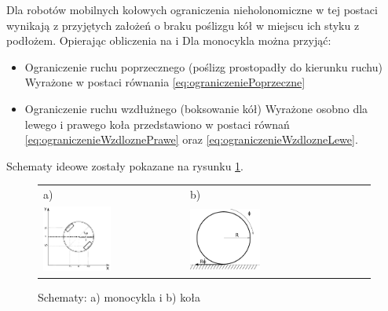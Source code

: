         Dla robotów mobilnych kołowych ograniczenia nieholonomiczne w tej postaci wynikają z przyjętych założeń o braku poślizgu kół w miejscu ich styku z podłożem. Opierając obliczenia na \cite{Mazur} i \cite{Cholewinski} Dla monocykla można przyjąć:
        \begin{itemize}
            \item Ograniczenie ruchu poprzecznego (poślizg prostopadły do kierunku ruchu) \newline
                Wyrażone w postaci równania \ref{eq:ograniczeniePoprzeczne}
            \item Ograniczenie ruchu wzdłużnego (boksowanie kół) \newline
                Wyrażone osobno dla lewego i prawego koła przedstawiono w postaci równań \ref{eq:ograniczenieWzdloznePrawe} oraz \ref{eq:ograniczenieWzdlozneLewe}.
        \end{itemize}
        Schematy ideowe zostały pokazane na rysunku \ref{fig:monocykSchemat}.
    	\begin{figure}[ht]
			\centering
			\begin{tabular}{@{}ll@{}}
				a) & b) \\
				\includegraphics[width=0.5\textwidth]{rys01/rysunek.pdf} & 
				\includegraphics[width=0.4\textwidth]{rys02/kolo.pdf} \\
			\end{tabular}
			\caption{Schematy: a) monocykla i b) koła}
			\label{fig:monocykSchemat}
		\end{figure}
    	
